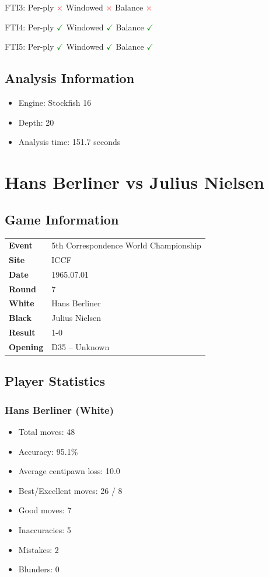 \documentclass[11pt]{book}
\begin{document}
FTI3: Per-ply \textcolor{red}{$\times$} \quad Windowed \textcolor{red}{$\times$} \quad Balance \textcolor{red}{$\times$}

FTI4: Per-ply \textcolor{green}{$\checkmark$} \quad Windowed \textcolor{green}{$\checkmark$} \quad Balance \textcolor{green}{$\checkmark$}

FTI5: Per-ply \textcolor{green}{$\checkmark$} \quad Windowed \textcolor{green}{$\checkmark$} \quad Balance \textcolor{green}{$\checkmark$}

\section{Analysis Information}
\begin{itemize}
\item Engine: Stockfish 16
\item Depth: 20
\item Analysis time: 151.7 seconds
\end{itemize}

\chapter{Hans Berliner vs Julius Nielsen}

\section{Game Information}
\begin{tabular}{ll}
\textbf{Event} & 5th Correspondence World Championship \\
\textbf{Site} & ICCF \\
\textbf{Date} & 1965.07.01 \\
\textbf{Round} & 7 \\
\textbf{White} & Hans Berliner \\
\textbf{Black} & Julius Nielsen \\
\textbf{Result} & 1-0 \\
\textbf{Opening} & D35 -- Unknown \\
\end{tabular}

\section{Player Statistics}

\subsection{Hans Berliner (White)}
\begin{itemize}
\item Total moves: 48
\item Accuracy: 95.1\%
\item Average centipawn loss: 10.0
\item Best/Excellent moves: 26 / 8
\item Good moves: 7
\item Inaccuracies: 5
\item Mistakes: 2
\item Blunders: 0
\end{itemize}
\end{document}
